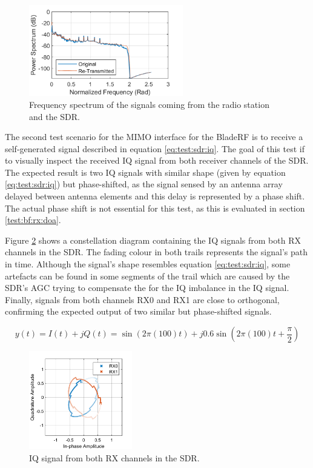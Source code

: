 \documentclass[12pt,a4paper]{report}
\begin{document}
\begin{figure}
    \centering
    \includegraphics[width = 0.6\textwidth]{Figures/sdr_spectrum.png}
    \caption{Frequency spectrum of the signals coming from the radio station and the SDR.}
    \label{fig:test:sdr:spectrum}
\end{figure}

The second test scenario for the MIMO interface for the BladeRF is to receive a self-generated signal described in equation \ref{eq:test:sdr:iq}. The goal of this test if to visually inspect the received IQ signal from both receiver channels of the SDR. The expected result is two IQ signals with similar shape (given by equation \ref{eq:test:sdr:iq}) but phase-shifted, as the signal sensed by an antenna array delayed between antenna elements and this delay is represented by a phase shift. The actual phase shift is not essential for this test, as this is evaluated in section \ref{test:bf:rx:doa}.

Figure \ref{fig:test:sdr:iq} shows a constellation diagram containing the IQ signals from both RX channels in the SDR. The fading colour in both trails represents the signal's path in time. Although the signal's shape resembles equation \ref{eq:test:sdr:iq}, some artefacts can be found in some segments of the trail which are caused by the SDR's AGC trying to compensate the for the IQ imbalance in the IQ signal. Finally, signals from both channels RX0 and RX1 are close to orthogonal, confirming the expected output of two similar but phase-shifted signals.

\begin{equation}
    y(t) = I(t) + j Q(t) = \sin(2\pi (100) t) + j 0.6 \sin(2\pi(100) t + \frac{\pi}{2})
    \label{eq:test:sdr:iq}
\end{equation}

\begin{figure}[h]
    \centering
    \includegraphics[width = 0.4\textwidth]{Figures/rx_channels.png}
    \caption{IQ signal from both RX channels in the SDR.}
    \label{fig:test:sdr:iq}
\end{figure}
\end{document}
